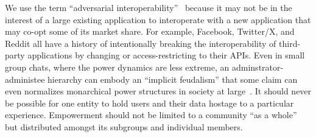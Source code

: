 
We use the term ``adversarial interoperability''~\cite{adversarialinterop} because it may not be in the
interest of a large existing application to interoperate with a new application that may co-opt some of its market share.
For example, Facebook, Twitter/X, and Reddit all have a history of intentionally breaking
the interoperability of third-party applications by changing or access-restricting to their APIs.
Even in small group chats, where the power dynamics are less extreme,
an adminstrator-administee hierarchy
can embody an ``implicit feudalism'' that some claim can even
normalizes monarchical power structures in society at large~\cite{governablespaces}.
It should never be possible for one entity to hold users
and their data hostage to a particular experience.
Empowerment should not be limited to a community ``as a whole'' but
distributed amongst its subgroups and individual members.









